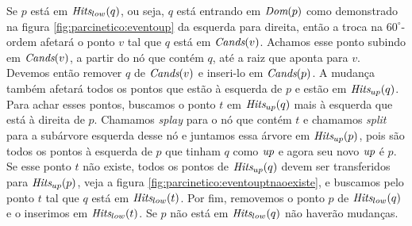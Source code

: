 Se $p$ está em $\textit{Hits}_{low}(q)$, ou seja, $q$ está entrando em
$\textit{Dom}(p)$ como demonstrado na figura \ref{fig:parcinetico:eventoup}
da esquerda para direita, então a troca na $60^\circ$-ordem afetará
o ponto $v$ tal que $q$ está em $\textit{Cands}(v)$. Achamos esse ponto
subindo em $\textit{Cands}(v)$, a partir do nó que contém $q$, até a raiz
que aponta para $v$. Devemos então remover $q$ de $\textit{Cands}(v)$ e
inseri-lo em $\textit{Cands}(p)$. A mudança também afetará todos os pontos
que estão à esquerda de $p$ e estão em $\textit{Hits}_{up}(q)$. Para achar
esses pontos, buscamos o ponto $t$ em $\textit{Hits}_{up}(q)$ mais à
esquerda que está à direita de $p$. Chamamos \textit{splay} para o
nó que contém $t$ e chamamos \textit{split} para a subárvore
esquerda desse nó e juntamos essa árvore em $\textit{Hits}_{up}(p)$, pois
são todos os pontos à esquerda de $p$ que tinham $q$ como $\textit{up}$ e
agora seu novo $\textit{up}$ é $p$. Se esse ponto $t$ não existe, todos os
pontos de $\textit{Hits}_{up}(q)$ devem ser transferidos para
$\textit{Hits}_{up}(p)$, veja a figura
\ref{fig:parcinetico:eventouptnaoexiste}, e buscamos pelo ponto $t$
tal que $q$ está em $\textit{Hits}_{low}(t)$. Por fim, removemos o ponto $p$
de $\textit{Hits}_{low}(q)$ e o inserimos em $\textit{Hits}_{low}(t)$. Se $p$ não
está em $\textit{Hits}_{low}(q)$ não haverão mudanças.


